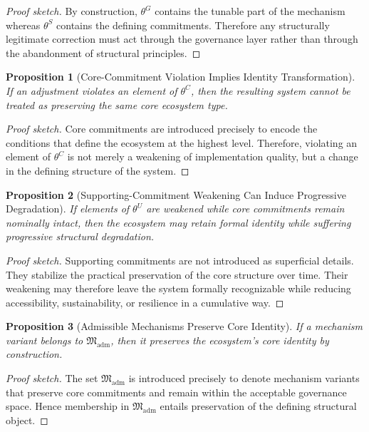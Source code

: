 \documentclass[11pt]{article}
\newtheorem{proposition}{Proposition}
\begin{document}
\begin{proof}[Proof sketch]
By construction, \(\theta^{G}\) contains the tunable part of the mechanism whereas \(\theta^{S}\) contains the defining commitments. Therefore any structurally legitimate correction must act through the governance layer rather than through the abandonment of structural principles.
\end{proof}

\begin{proposition}[Core-Commitment Violation Implies Identity Transformation]
If an adjustment violates an element of \(\theta^{C}\), then the resulting system cannot be treated as preserving the same core ecosystem type.
\end{proposition}

\begin{proof}[Proof sketch]
Core commitments are introduced precisely to encode the conditions that define the ecosystem at the highest level. Therefore, violating an element of \(\theta^{C}\) is not merely a weakening of implementation quality, but a change in the defining structure of the system.
\end{proof}

\begin{proposition}[Supporting-Commitment Weakening Can Induce Progressive Degradation]
If elements of \(\theta^{U}\) are weakened while core commitments remain nominally intact, then the ecosystem may retain formal identity while suffering progressive structural degradation.
\end{proposition}

\begin{proof}[Proof sketch]
Supporting commitments are not introduced as superficial details. They stabilize the practical preservation of the core structure over time. Their weakening may therefore leave the system formally recognizable while reducing accessibility, sustainability, or resilience in a cumulative way.
\end{proof}

\begin{proposition}[Admissible Mechanisms Preserve Core Identity]
If a mechanism variant belongs to \(\mathfrak{M}_{\mathrm{adm}}\), then it preserves the ecosystem's core identity by construction.
\end{proposition}

\begin{proof}[Proof sketch]
The set \(\mathfrak{M}_{\mathrm{adm}}\) is introduced precisely to denote mechanism variants that preserve core commitments and remain within the acceptable governance space. Hence membership in \(\mathfrak{M}_{\mathrm{adm}}\) entails preservation of the defining structural object.
\end{proof}
\end{document}
